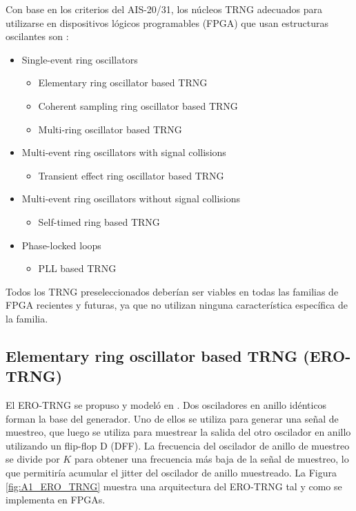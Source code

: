         Con base en los criterios del AIS-20/31, los núcleos TRNG adecuados para utilizarse en dispositivos lógicos programables (FPGA) que usan estructuras oscilantes son \cite{Petura2016}:
	
        \begin{itemize}
            \item Single-event ring oscillators
                \begin{itemize}
                    \item Elementary ring oscillator based TRNG 
                    \item Coherent sampling ring oscillator based TRNG 
                    \item Multi-ring oscillator based TRNG 
                \end{itemize}
            \item Multi-event ring oscillators with signal collisions
                \begin{itemize}
                    \item Transient effect ring oscillator based TRNG 
                \end{itemize}
            \item Multi-event ring oscillators without signal collisions
                \begin{itemize}
                    \item Self-timed ring based TRNG 
                \end{itemize}
            \item Phase-locked loops
                \begin{itemize}
                    \item PLL based TRNG 
                \end{itemize}
        \end{itemize}

        Todos los TRNG preseleccionados deberían ser viables en todas las familias de FPGA recientes y futuras, ya que no utilizan ninguna característica específica de la familia.

            	
		\subsection{Elementary ring oscillator based TRNG (ERO-TRNG)}
		
                El ERO-TRNG se propuso y modeló en \cite{Baudet2010}. Dos osciladores en anillo idénticos forman la base del generador. Uno de ellos se utiliza para generar una señal de muestreo, que luego se utiliza para muestrear la salida del otro oscilador en anillo utilizando un flip-flop D (DFF). La frecuencia del oscilador de anillo de muestreo se divide por $K$ para obtener una frecuencia más baja de la señal de muestreo, lo que permitiría acumular el jitter del oscilador de anillo muestreado. La Figura \ref{fig:A1_ERO_TRNG} muestra una arquitectura del ERO-TRNG tal y como se implementa en FPGAs.
					

